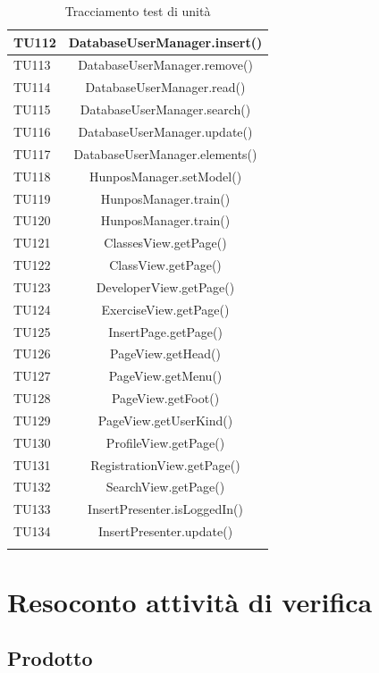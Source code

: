\begin{longtable}{|>{\centering\arraybackslash}m{1.6cm}|c|}
		TU112 & DatabaseUserManager.insert()  \\ \hline
		TU113 & DatabaseUserManager.remove()  \\ \hline
		TU114 & DatabaseUserManager.read()  \\ \hline
		TU115 & DatabaseUserManager.search()  \\ \hline
		TU116 & DatabaseUserManager.update()  \\ \hline
		TU117 & DatabaseUserManager.elements()  \\ \hline
		TU118 & HunposManager.setModel()  \\ \hline
		TU119 & HunposManager.train()  \\ \hline
		TU120 & HunposManager.train()  \\ \hline
		
		TU121 & ClassesView.getPage()\\ \hline
		TU122 & ClassView.getPage()\\ \hline
		TU123 & DeveloperView.getPage()\\ \hline
		TU124 & ExerciseView.getPage()\\ \hline
		TU125 & InsertPage.getPage()\\ \hline
		TU126 & PageView.getHead()\\ \hline
		TU127 & PageView.getMenu() \\ \hline
		TU128 & PageView.getFoot()\\ \hline
		TU129 & PageView.getUserKind()\\ \hline
		TU130 & ProfileView.getPage()\\ \hline
		TU131 & RegistrationView.getPage()\\ \hline
		TU132 & SearchView.getPage()\\ \hline
		
		TU133 & InsertPresenter.isLoggedIn()  \\ \hline
		TU134 & InsertPresenter.update()  \\ \hline
		
		
		\caption{Tracciamento test di unità}
\end{longtable}

	
\newpage
\section{Resoconto attività di verifica}
\subsection{Prodotto}

